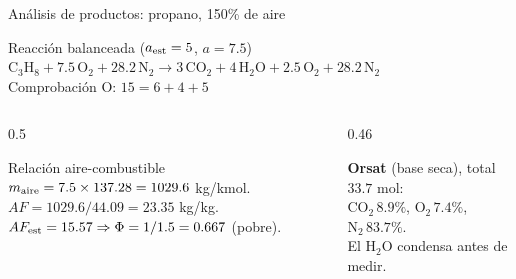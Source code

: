 \documentclass[aspectratio=169,10pt]{beamer}
\begin{document}
\begin{frame}{Análisis de productos: propano, 150\% de aire}
\begin{cardidea}{Reacción balanceada ($a_{\rm est}=5$, $a=7.5$)}{\faCalculator}
\footnotesize
$\mathrm{C_3H_8}+7.5\,\mathrm{O_2}+28.2\,\mathrm{N_2}\longrightarrow 3\,\mathrm{CO_2}+4\,\mathrm{H_2O}+2.5\,\mathrm{O_2}+28.2\,\mathrm{N_2}$\\[0.4mm]
Comprobación O: $15=6+4+5$ \checkmark
\end{cardidea}
\vspace{1.0mm}
\begin{columns}[T]
\begin{column}{0.5\textwidth}
\begin{cardgear}{Relación aire-combustible}{\faSuperscript}
\footnotesize
$m_{\rm aire}=7.5\times137.28=1029.6$ kg/kmol.\\[0.4mm]
$AF=1029.6/44.09=23.35$ kg/kg.\\[0.4mm]
$AF_{\rm est}=15.57\Rightarrow\Phi=1/1.5=0.667$ (pobre).
\end{cardgear}
\end{column}
\begin{column}{0.46\textwidth}
\begin{cardnota}[\faTable]
\footnotesize
\textbf{Orsat} (base seca), total $33.7$ mol:\\[0.4mm]
$\mathrm{CO_2}\,8.9\%$, $\mathrm{O_2}\,7.4\%$, $\mathrm{N_2}\,83.7\%$.\\[0.3mm]
El $\mathrm{H_2O}$ condensa antes de medir.
\end{cardnota}
\end{column}
\end{columns}
\end{frame}
\end{document}
